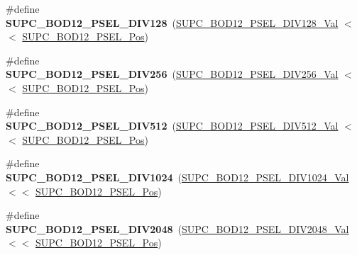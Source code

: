 \begin{DoxyCompactItemize}
\item 
\hypertarget{group___s_a_m_l21___s_u_p_c_ga46fff1a1e9a13130a6791c9faf77b37e}{}\#define {\bfseries S\+U\+P\+C\+\_\+\+B\+O\+D12\+\_\+\+P\+S\+E\+L\+\_\+\+D\+I\+V128}~(\hyperlink{group___s_a_m_l21___s_u_p_c_gaf069f29a7ff5c52ad68726c11adb77ab}{S\+U\+P\+C\+\_\+\+B\+O\+D12\+\_\+\+P\+S\+E\+L\+\_\+\+D\+I\+V128\+\_\+\+Val}    $<$$<$ \hyperlink{group___s_a_m_l21___s_u_p_c_ga43d50cdce3fb9ed37bfc9007dccac0d2}{S\+U\+P\+C\+\_\+\+B\+O\+D12\+\_\+\+P\+S\+E\+L\+\_\+\+Pos})\label{group___s_a_m_l21___s_u_p_c_ga46fff1a1e9a13130a6791c9faf77b37e}

\item 
\hypertarget{group___s_a_m_l21___s_u_p_c_ga32768ba603f86c8822606c8503413bff}{}\#define {\bfseries S\+U\+P\+C\+\_\+\+B\+O\+D12\+\_\+\+P\+S\+E\+L\+\_\+\+D\+I\+V256}~(\hyperlink{group___s_a_m_l21___s_u_p_c_ga06571dce79ef340d25d2f7025b605353}{S\+U\+P\+C\+\_\+\+B\+O\+D12\+\_\+\+P\+S\+E\+L\+\_\+\+D\+I\+V256\+\_\+\+Val}    $<$$<$ \hyperlink{group___s_a_m_l21___s_u_p_c_ga43d50cdce3fb9ed37bfc9007dccac0d2}{S\+U\+P\+C\+\_\+\+B\+O\+D12\+\_\+\+P\+S\+E\+L\+\_\+\+Pos})\label{group___s_a_m_l21___s_u_p_c_ga32768ba603f86c8822606c8503413bff}

\item 
\hypertarget{group___s_a_m_l21___s_u_p_c_ga88be3d96519a5725adc6c17ac315ef63}{}\#define {\bfseries S\+U\+P\+C\+\_\+\+B\+O\+D12\+\_\+\+P\+S\+E\+L\+\_\+\+D\+I\+V512}~(\hyperlink{group___s_a_m_l21___s_u_p_c_gadb7725fedb7613a361fae4329158564d}{S\+U\+P\+C\+\_\+\+B\+O\+D12\+\_\+\+P\+S\+E\+L\+\_\+\+D\+I\+V512\+\_\+\+Val}    $<$$<$ \hyperlink{group___s_a_m_l21___s_u_p_c_ga43d50cdce3fb9ed37bfc9007dccac0d2}{S\+U\+P\+C\+\_\+\+B\+O\+D12\+\_\+\+P\+S\+E\+L\+\_\+\+Pos})\label{group___s_a_m_l21___s_u_p_c_ga88be3d96519a5725adc6c17ac315ef63}

\item 
\hypertarget{group___s_a_m_l21___s_u_p_c_gac05d3cd937d881570f82d99da74c5850}{}\#define {\bfseries S\+U\+P\+C\+\_\+\+B\+O\+D12\+\_\+\+P\+S\+E\+L\+\_\+\+D\+I\+V1024}~(\hyperlink{group___s_a_m_l21___s_u_p_c_ga7f60f5e2aa0cfd9da64dc363f052109e}{S\+U\+P\+C\+\_\+\+B\+O\+D12\+\_\+\+P\+S\+E\+L\+\_\+\+D\+I\+V1024\+\_\+\+Val}   $<$$<$ \hyperlink{group___s_a_m_l21___s_u_p_c_ga43d50cdce3fb9ed37bfc9007dccac0d2}{S\+U\+P\+C\+\_\+\+B\+O\+D12\+\_\+\+P\+S\+E\+L\+\_\+\+Pos})\label{group___s_a_m_l21___s_u_p_c_gac05d3cd937d881570f82d99da74c5850}

\item 
\hypertarget{group___s_a_m_l21___s_u_p_c_gaa4e0dad6975d2f6e818bc360fd880166}{}\#define {\bfseries S\+U\+P\+C\+\_\+\+B\+O\+D12\+\_\+\+P\+S\+E\+L\+\_\+\+D\+I\+V2048}~(\hyperlink{group___s_a_m_l21___s_u_p_c_gacb7e3fd6a7cec31f37fe6e15c4bccad6}{S\+U\+P\+C\+\_\+\+B\+O\+D12\+\_\+\+P\+S\+E\+L\+\_\+\+D\+I\+V2048\+\_\+\+Val}   $<$$<$ \hyperlink{group___s_a_m_l21___s_u_p_c_ga43d50cdce3fb9ed37bfc9007dccac0d2}{S\+U\+P\+C\+\_\+\+B\+O\+D12\+\_\+\+P\+S\+E\+L\+\_\+\+Pos})\label{group___s_a_m_l21___s_u_p_c_gaa4e0dad6975d2f6e818bc360fd880166}


\end{DoxyCompactItemize}
